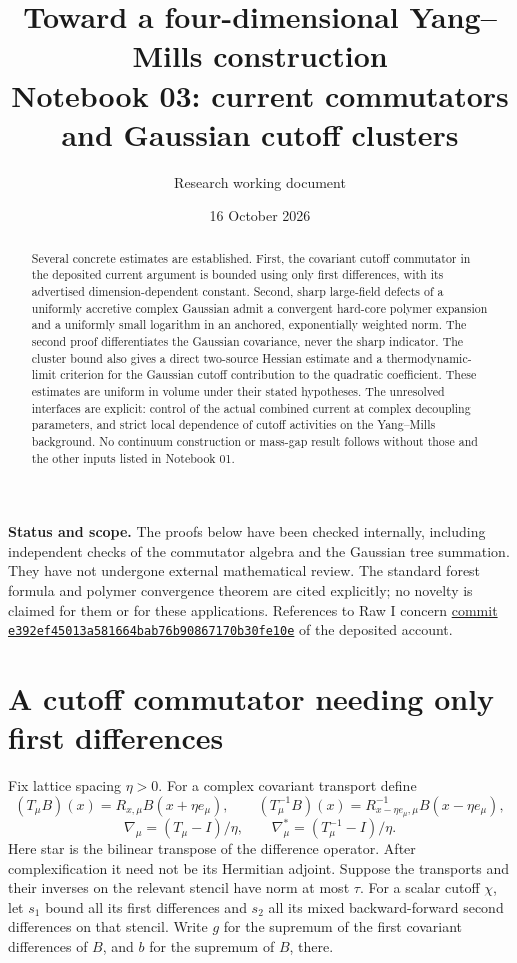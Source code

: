 \documentclass[11pt]{article}
\title{Toward a four-dimensional Yang--Mills construction\\
\large Notebook 03: current commutators and Gaussian cutoff clusters}
\author{Research working document}
\date{16 October 2026}
\theoremstyle{remark}
\begin{document}
\maketitle

\begin{abstract}
Several concrete estimates are established. First, the covariant cutoff
commutator in the deposited current argument is bounded using only
first differences, with its advertised dimension-dependent constant.
Second, sharp large-field defects of a uniformly accretive complex
Gaussian admit a convergent hard-core polymer expansion and a uniformly
small logarithm in an anchored, exponentially weighted norm. The second
proof differentiates the Gaussian covariance, never the sharp indicator.
The cluster bound also gives a direct two-source Hessian estimate and
a thermodynamic-limit criterion for the Gaussian cutoff contribution
to the quadratic coefficient. These estimates are uniform in volume
under their stated hypotheses.
The unresolved interfaces are explicit: control of the actual combined
current at complex decoupling parameters, and strict local dependence of
cutoff activities on the Yang--Mills background. No continuum construction
or mass-gap result follows without those and the other inputs listed in
Notebook 01.
\end{abstract}

\noindent\textbf{Status and scope.}
The proofs below have been checked internally, including independent
checks of the commutator algebra and the Gaussian tree summation. They
have not undergone external mathematical review. The standard forest
formula and polymer convergence theorem are cited explicitly; no novelty
is claimed for them or for these applications. References to Raw I concern
\href{https://github.com/ethanwsussman/Yang--Mills-LLM-experiment/tree/e392ef45013a581664bab76b90867170b30fe10e}
{commit \texttt{e392ef4501\allowbreak 3a581664ba\allowbreak b76b908671\allowbreak 70b30fe10e}}
of the deposited account.

\section{A cutoff commutator needing only first differences}

Fix lattice spacing $\eta>0$. For a complex covariant transport define
\[
 (T_\mu B)(x)=R_{x,\mu}B(x+\eta e_\mu),\qquad
 (T_\mu^{-1}B)(x)=R_{x-\eta e_\mu,\mu}^{-1}B(x-\eta e_\mu),
\]
\[
 \nabla_\mu=(T_\mu-I)/\eta,\qquad
 \nabla_\mu^*=(T_\mu^{-1}-I)/\eta.
\]
Here star is the bilinear transpose of the difference operator. After
complexification it need not be its Hermitian adjoint. Suppose the
transports and their inverses on the relevant stencil have norm at most
$\tau$. For a scalar cutoff $\chi$, let $s_1$ bound all its first
differences and $s_2$ all its mixed backward-forward second differences
on that stencil. Write $g$ for the supremum of the first covariant
differences of $B$, and $b$ for the supremum of $B$, there.
\end{document}
